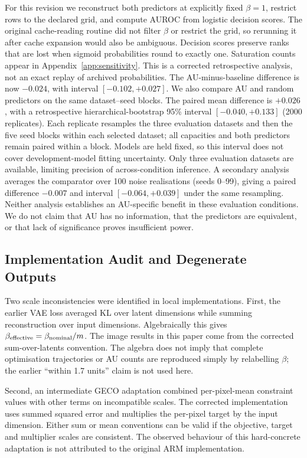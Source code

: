 \documentclass[make,article,submit,pdftex,moreauthors]{Definitions/mdpi}
\begin{document}
For this revision we reconstruct both predictors at explicitly fixed
$\beta=1$, restrict rows to the declared grid, and compute AUROC from
logistic decision scores. The original cache-reading routine did not
filter $\beta$ or restrict the grid, so rerunning it after cache expansion
would also be ambiguous. Decision scores preserve ranks that are lost
when sigmoid probabilities round to exactly one. Saturation counts
appear in Appendix~\ref{app:sensitivity}. This is a corrected retrospective
analysis, not an exact replay of archived probabilities. The
AU-minus-baseline difference is now $-0.024$, with interval
$[-0.102,+0.027]$. We also compare AU and random
predictors on the same dataset--seed blocks.
The paired mean difference is $+0.026$, with a retrospective
hierarchical-bootstrap 95\% interval $[-0.040,+0.133]$ (2000
replicates). Each replicate resamples the three evaluation datasets and
then the five seed blocks within each selected dataset; all capacities
and both predictors remain paired within a block. Models are held fixed,
so this interval does not cover development-model fitting uncertainty.
Only three evaluation datasets are available, limiting precision of
across-condition inference. A secondary analysis averages the comparator
over 100 noise realisations (seeds 0--99), giving a paired difference
$-0.007$ and interval $[-0.064,+0.039]$ under the
same resampling. Neither analysis establishes an AU-specific benefit in
these evaluation conditions. We do not claim that AU has no information,
that the predictors are equivalent, or that lack of significance proves
insufficient power.

\subsection{Implementation Audit and Degenerate Outputs}
Two scale inconsistencies were identified in local implementations.
First, the earlier VAE loss averaged KL over latent dimensions while
summing reconstruction over input dimensions. Algebraically this gives
$\beta_{\rm effective}=\beta_{\rm nominal}/m$. The image results in
this paper come from the corrected sum-over-latents convention. The
algebra does not imply that complete optimisation trajectories or AU
counts are reproduced simply by relabelling $\beta$; the earlier
``within 1.7 units'' claim is not used here.

Second, an intermediate GECO adaptation combined per-pixel-mean
constraint values with other terms on incompatible scales. The corrected
implementation uses summed squared error and multiplies the per-pixel
target by the input dimension. Either sum or mean conventions can be
valid if the objective, target and multiplier scales are consistent.
The observed behaviour of this hard-concrete adaptation is not attributed
to the original ARM implementation.
\end{document}

